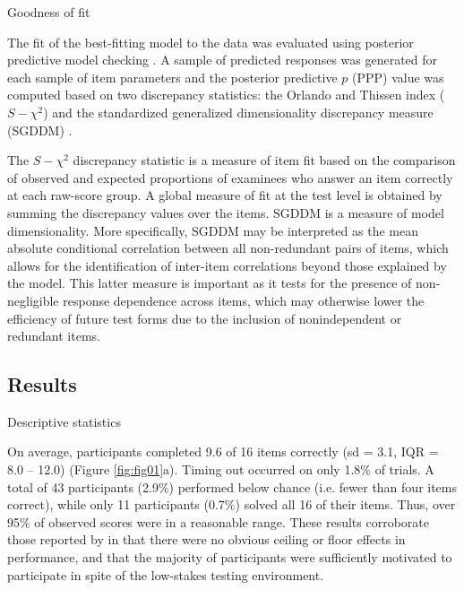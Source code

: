 \documentclass[a4paper,man,natbib]{apa6}
\makeatletter
\renewcommand{\subsubsection}{\@startsection{subsubsection}{3}
  {\z@}%
  {\b@level@two@skip}{\e@level@two@skip}%
  {\normalfont\normalsize\bfseries}}
\makeatother
\begin{document}
\subsubsection{Goodness of fit}

The fit of the best-fitting model to the data was evaluated using posterior predictive model checking \citep{gelman1996posterior, levy2017bayesian}. A sample of predicted responses was generated for each sample of item parameters and the posterior predictive $p$ (PPP) value was computed based on two discrepancy statistics:  the Orlando and Thissen index ($S-\chi^2$) \citep{toribio2011discrepancy} and the standardized generalized dimensionality discrepancy measure (SGDDM) \citep{levy2015standardized}. 

The $S-\chi^2$ discrepancy statistic is a measure of item fit based on the comparison of observed and expected proportions of examinees who answer an item correctly at each raw-score group. A global measure of fit at the test level is obtained by summing the discrepancy values over the items. SGDDM is a measure of model dimensionality. More specifically, SGDDM may be interpreted as the mean absolute conditional correlation between all non-redundant pairs of items, which allows for the identification of inter-item correlations beyond those explained by the model. This latter measure is important as it tests for the presence of non-negligible response dependence across items, which may otherwise lower the efficiency of future test forms due to the inclusion of nonindependent or  redundant items.

\subsection{Results}

\subsubsection{Descriptive statistics}

On average, participants completed 9.6 of 16 items correctly (sd = 3.1, IQR = 8.0 -- 12.0) (Figure \ref{fig:fig01}a). Timing out occurred on only 1.8\% of trials. A total of 43 participants (2.9\%) performed below chance (i.e. fewer than four items correct), while only 11 participants (0.7\%) solved all 16 of their items. Thus, over 95\% of observed scores were in a reasonable range. These results corroborate those reported by \cite{chierchia2019matrix} in that there were no obvious ceiling or floor effects in performance, and that the majority of participants were sufficiently motivated to participate in spite of the low-stakes testing environment.  
\end{document}
